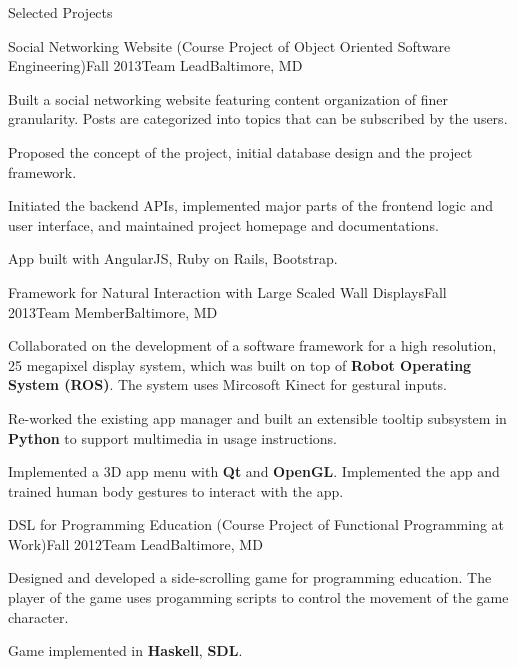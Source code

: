 \documentclass{resume} %
\begin{document}
\begin{rSection}{Selected Projects}
\begin{rSubsection}{Social Networking Website (Course Project of Object Oriented Software Engineering)}{Fall 2013}{Team Lead}{Baltimore, MD}
\item Built a social networking website featuring content organization of finer granularity. Posts are categorized into topics that can be subscribed by the users.
\item Proposed the concept of the project, initial database design and the project framework.
\item Initiated the backend APIs, implemented major parts of the frontend logic and user interface, and maintained project homepage and documentations.
\item App built with AngularJS, Ruby on Rails, Bootstrap.
\end{rSubsection}
\begin{rSubsection}{Framework for Natural Interaction with Large Scaled Wall Displays}{Fall 2013}{Team Member}{Baltimore, MD}
\item Collaborated on the development of a software framework for a high resolution, 25 megapixel
display system, which was built on top of \textbf{Robot Operating System (ROS)}. The system uses Mircosoft Kinect for gestural inputs.
\item Re-worked the existing app manager and built an extensible tooltip subsystem in \textbf{Python} to support
multimedia in usage instructions.
\item Implemented a 3D app menu with \textbf{Qt} and \textbf{OpenGL}. Implemented the app and trained human body gestures to interact with the app.
\end{rSubsection}
\begin{rSubsection}{DSL for Programming Education (Course Project of Functional Programming at Work)}{Fall 2012}{Team Lead}{Baltimore, MD}
\item Designed and developed a side-scrolling game for programming education. The player of the game uses progamming scripts to control the movement of the game character.
\item Game implemented in \textbf{Haskell}, \textbf{SDL}.
\end{rSubsection}
\end{rSection}
\end{document}
